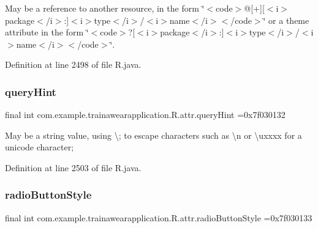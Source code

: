 May be a reference to another resource, in the form \char`\"{}$<$code$>$@\mbox{[}+\mbox{]}\mbox{[}$<$i$>$package$<$/i$>$\+:\mbox{]}$<$i$>$type$<$/i$>$/$<$i$>$name$<$/i$>$$<$/code$>$\char`\"{} or a theme attribute in the form \char`\"{}$<$code$>$?\mbox{[}$<$i$>$package$<$/i$>$\+:\mbox{]}$<$i$>$type$<$/i$>$/$<$i$>$name$<$/i$>$$<$/code$>$\char`\"{}. 

Definition at line 2498 of file R.\+java.

\mbox{\label{classcom_1_1example_1_1trainawearapplication_1_1_r_1_1attr_adca542daf6438502183c28c6bfa6b73f}} 
\subsubsection{\texorpdfstring{queryHint}{queryHint}}
{\footnotesize\ttfamily final int com.\+example.\+trainawearapplication.\+R.\+attr.\+query\+Hint =0x7f030132\hspace{0.3cm}{\ttfamily [static]}}

May be a string value, using \textquotesingle{}\textbackslash{};\textquotesingle{} to escape characters such as \textquotesingle{}\textbackslash{}n\textquotesingle{} or \textquotesingle{}\textbackslash{}uxxxx\textquotesingle{} for a unicode character; 

Definition at line 2503 of file R.\+java.

\mbox{\label{classcom_1_1example_1_1trainawearapplication_1_1_r_1_1attr_a8dada23e929aac4868c3483a74a0b2f2}} 
\subsubsection{\texorpdfstring{radioButtonStyle}{radioButtonStyle}}
{\footnotesize\ttfamily final int com.\+example.\+trainawearapplication.\+R.\+attr.\+radio\+Button\+Style =0x7f030133\hspace{0.3cm}{\ttfamily [static]}}

